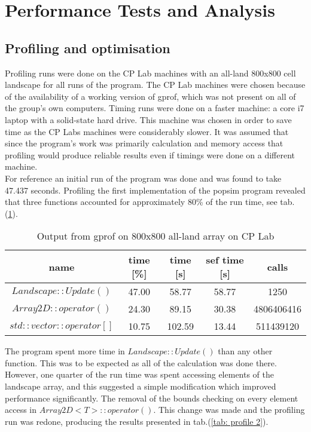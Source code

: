 \section{Performance Tests and Analysis}
\label{Performance Tests and Analysis}

\subsection{Profiling and optimisation}
\label{Profiling and optimisation}

Profiling runs were done on the CP Lab machines with an all-land 800x800 cell landscape for all runs of the program.  The CP Lab machines were chosen because of the availability of a working version of gprof, which was not present on all of the group's own computers. 
Timing runs were done on a faster machine: a core i7 laptop with a solid-state hard drive. 
This machine was chosen in order to save time as the CP Labs machines were considerably slower. 
It was assumed that since the program's work was primarily calculation and memory access that profiling would produce reliable results even if timings were done on a different machine.\\

For reference an initial run of the program was done and was found to take 47.437 seconds.  Profiling the first implementation of the popsim program revealed that three functions accounted for approximately 80\% of the run time, see tab.(\ref{tab: profile 1}).


\begin{table}
\caption{Output from gprof on 800x800 all-land array on CP Lab}
\label{tab: profile 1}
 \begin{center}
\begin{tabular}{|c|c|c|c|c|}
\hline
name & time [\%] & time [s] & sef time [s] & calls\\
\hline
$Landscape::Update()$ & 47.00 & 58.77 & 58.77 & 1250\\
\hline
$Array2D::operator()$& 24.30 & 89.15 & 30.38& 4806406416\\
\hline
$std::vector::operator[]$& 10.75& 102.59 & 13.44 & 511439120\\
\hline
\end{tabular}
\end{center}
\end{table}


The program spent more time in $Landscape::Update()$ than any other function.
This was to be expected as all of the calculation was done there. However, one quarter of the run time was spent accessing elements of the landscape array, and this suggested a simple modification which improved performance significantly.
The removal of the bounds checking on every element access in $Array2D<T>::operator()$. This change was made and the profiling run was redone, producing the results presented in tab.(\ref{tab: profile 2}).

